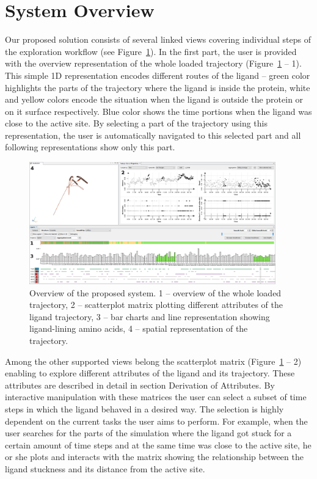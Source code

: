 \documentclass[twocolumn]{bmcart}%
\begin{document}
\section*{System Overview}
Our proposed solution consists of several linked views covering individual steps of the exploration workflow (see Figure~\ref{fig:overview}). 
In the first part, the user is provided with the overview representation of the whole loaded trajectory (Figure~\ref{fig:overview} -- 1). 
This simple 1D representation encodes different routes of the ligand -- green color highlights the parts of the trajectory where the ligand is inside the protein, white and yellow colors encode the situation when the ligand is outside the protein or on it surface respectively.
Blue color shows the time portions when the ligand was close to the active site.
By selecting a part of the trajectory using this representation, the user is automatically navigated to this selected part and all following representations show only this part.

\begin{figure}[thb]
	\centering
  \includegraphics[width=0.95\textwidth]{img/overview.png}
  \caption{\label{fig:overview} Overview of the proposed system. 1 -- overview of the whole loaded trajectory, 2 -- scatterplot matrix plotting different attributes of the ligand trajectory, 3 -- bar charts and line representation showing ligand-lining amino acids, 4 -- spatial representation of the trajectory.}
\end{figure}

Among the other supported views belong the scatterplot matrix (Figure~\ref{fig:overview} -- 2) enabling to explore different attributes of the ligand and its trajectory.
These attributes are described in detail in section Derivation of Attributes.
By interactive manipulation with these matrices the user can select a subset of time steps in which the ligand behaved in a desired way.
The selection is highly dependent on the current tasks the user aims to perform.
For example, when the user searches for the parts of the simulation where the ligand got stuck for a certain amount of time steps and at the same time was close to the active site, he or she plots and interacts with the matrix showing the relationship between the ligand stuckness and its distance from the active site.
\end{document}
